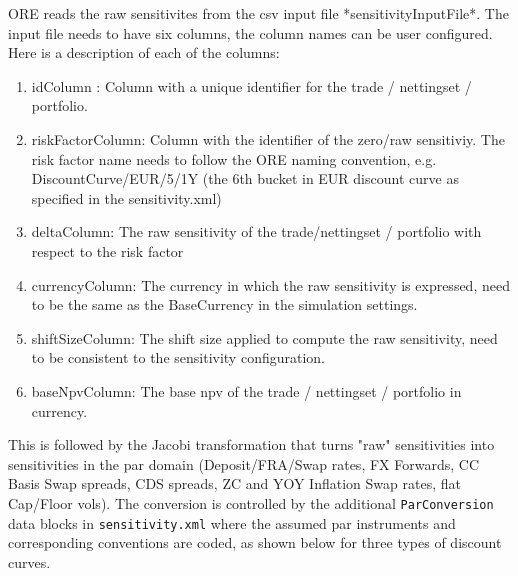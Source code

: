ORE reads the raw sensitivites from the csv input file *sensitivityInputFile*. The input file needs to have six  columns, the column names can be user configured. Here is a description of each of the columns:

\begin{enumerate}
\item idColumn : Column with a unique identifier for the trade / nettingset / portfolio.
\item riskFactorColumn: Column with the identifier of the zero/raw sensitiviy. The risk factor name needs to follow the ORE naming convention, e.g. DiscountCurve/EUR/5/1Y (the 6th bucket in EUR discount curve as specified in the sensitivity.xml)\
\item deltaColumn: The raw sensitivity of the trade/nettingset / portfolio with respect to the risk factor
\item currencyColumn: The currency in which the raw sensitivity is expressed, need to be the same as the BaseCurrency in the simulation settings.
\item shiftSizeColumn: The shift size applied to compute the raw sensitivity, need to be consistent to the sensitivity configuration.
\item baseNpvColumn: The base npv of the trade / nettingset / portfolio in currency.
\end{enumerate}

This is followed by the Jacobi transformation that turns "raw" sensitivities  into sensitivities in the par domain (Deposit/FRA/Swap rates, FX Forwards, CC Basis Swap spreads, 
CDS spreads, ZC and YOY Inflation Swap rates, flat Cap/Floor vols). The conversion is controlled by the additional {\tt ParConversion} data blocks 
in {\tt sensitivity.xml} where the assumed par instruments and corresponding conventions are coded, as shown below for three types of discount curves.

